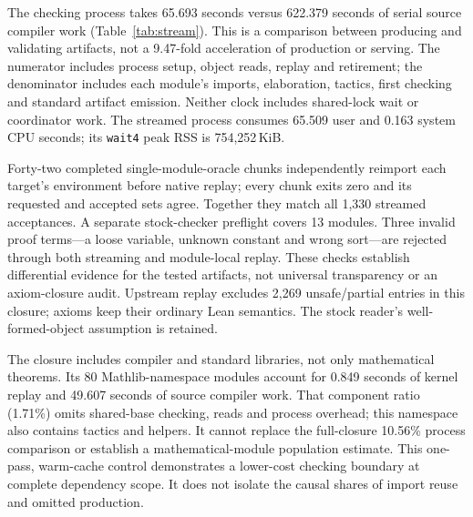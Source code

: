 \documentclass[10pt,twocolumn]{article}
\begin{document}
The checking process takes 65.693 seconds versus 622.379 seconds of serial
source compiler work (Table~\ref{tab:stream}).
This is a comparison between producing and validating artifacts, not a
9.47-fold acceleration of production or serving.
The numerator includes process setup, object reads, replay and retirement;
the denominator includes each module's imports, elaboration, tactics,
first checking and standard artifact emission.
Neither clock includes shared-lock wait or coordinator work.
The streamed process consumes 65.509 user and 0.163 system CPU seconds;
its \texttt{wait4} peak RSS is 754,252\,KiB.

Forty-two completed single-module-oracle chunks independently reimport each
target's environment before native replay; every chunk exits zero and its
requested and accepted sets agree. Together they match all 1,330 streamed
acceptances. A separate stock-checker preflight covers 13 modules.
Three invalid proof terms---a loose variable, unknown constant and wrong
sort---are rejected through both streaming and module-local replay.
These checks establish differential evidence for the tested artifacts,
not universal transparency or an axiom-closure audit.
Upstream replay excludes 2,269 unsafe/partial entries in this closure;
axioms keep their ordinary Lean semantics.
The stock reader's well-formed-object assumption is retained.

The closure includes compiler and standard libraries, not only mathematical
theorems. Its 80 Mathlib-namespace modules account for 0.849 seconds of
kernel replay and 49.607 seconds of source compiler work.
That component ratio (1.71\%) omits shared-base checking, reads and process
overhead; this namespace also contains tactics and helpers.
It cannot replace the full-closure 10.56\% process comparison or establish a
mathematical-module population estimate.
This one-pass, warm-cache control demonstrates a lower-cost checking boundary
at complete dependency scope. It does not isolate the causal shares of import
reuse and omitted production.
\end{document}
